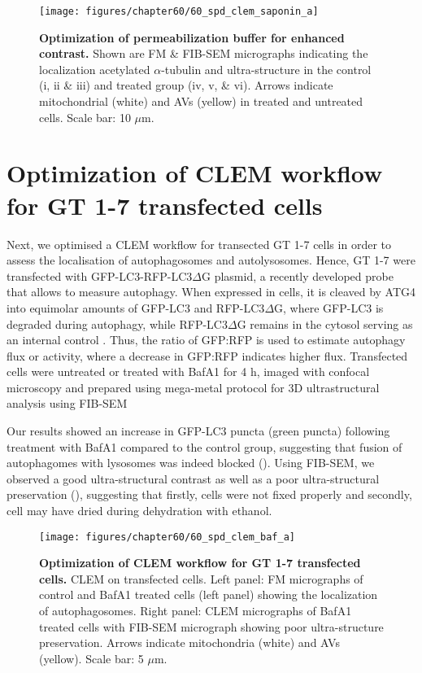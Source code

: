 \begin{landscape}
\begin{figure}[!htbp]
\center
  \texttt{[image: figures/chapter60/60\_spd\_clem\_saponin\_a]}
  \caption[Optimization of permeabilization buffer for enhanced contrast]{\textbf{Optimization of permeabilization buffer for enhanced contrast.} Shown are FM \& FIB-SEM micrographs indicating the localization acetylated $\alpha$-tubulin and ultra-structure in the control (i, ii \& iii) and treated group (iv, v, \& vi). Arrows indicate mitochondrial (white) and AVs (yellow) in treated and untreated cells. Scale bar: 10 $\mu$m.}
  \label{fig:60_spd_clem_saponin_a}
\end{figure} 
\end{landscape}

\section{Optimization of CLEM workflow for GT 1-7 transfected cells}
Next, we optimised a CLEM workflow for transected GT 1-7 cells in order to assess the localisation of autophagosomes and autolysosomes. Hence, GT 1-7 were transfected with GFP-LC3-RFP-LC3$\Delta$G plasmid, a recently developed probe that allows to measure autophagy. When expressed in cells, it is cleaved by ATG4 into equimolar amounts of GFP-LC3 and RFP-LC3$\Delta$G, where GFP-LC3 is degraded during autophagy, while RFP-LC3$\Delta$G remains in the cytosol serving as an internal control \citep{Kaizuka2016}. Thus, the ratio of GFP:RFP is used to estimate autophagy flux or activity, where a decrease in GFP:RFP indicates higher flux. Transfected cells were untreated or treated with BafA1 for 4 h, imaged with confocal microscopy and prepared using mega-metal protocol for 3D ultrastructural analysis using FIB-SEM

Our results showed an increase in GFP-LC3 puncta (green puncta) following treatment with BafA1 compared to the control group, suggesting that fusion of autophagomes with lysosomes was indeed blocked (). Using FIB-SEM, we observed a good ultra-structural contrast as well as a poor ultra-structural preservation (), suggesting that firstly, cells were not fixed properly and secondly, cell may have dried during dehydration with ethanol. 

\begin{landscape}
\begin{figure}[!htbp]
\center
  \texttt{[image: figures/chapter60/60\_spd\_clem\_baf\_a]}
  \caption[Optimization of CLEM workflow for GT 1-7 transfected cells]{\textbf{Optimization of CLEM workflow for GT 1-7 transfected cells.} CLEM on transfected cells. Left panel: FM micrographs of control and BafA1 treated cells (left panel) showing the localization of autophagosomes. Right panel: CLEM micrographs of BafA1 treated cells with FIB-SEM micrograph showing poor ultra-structure preservation. Arrows indicate mitochondria (white) and AVs (yellow). Scale bar: 5 $\mu$m.}
  \label{fig:60_spd_clem_baf_a}
\end{figure} 
\end{landscape}


